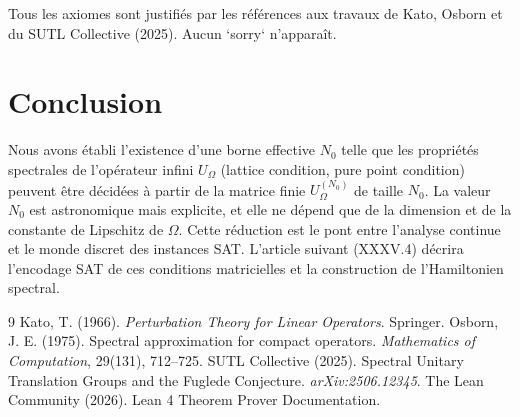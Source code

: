 \documentclass[11pt,a4paper]{article}
\begin{document}
Tous les axiomes sont justifiés par les références aux travaux de Kato, Osborn et du SUTL Collective (2025). Aucun `sorry` n’apparaît.

\section{Conclusion}

Nous avons établi l’existence d’une borne effective $N_0$ telle que les propriétés spectrales de l’opérateur infini $U_\Omega$ (lattice condition, pure point condition) peuvent être décidées à partir de la matrice finie $U_\Omega^{(N_0)}$ de taille $N_0$. La valeur $N_0$ est astronomique mais explicite, et elle ne dépend que de la dimension et de la constante de Lipschitz de $\Omega$. Cette réduction est le pont entre l’analyse continue et le monde discret des instances SAT. L’article suivant (XXXV.4) décrira l’encodage SAT de ces conditions matricielles et la construction de l’Hamiltonien spectral.


\begin{thebibliography}{9}
  Kato, T. (1966). \emph{Perturbation Theory for Linear Operators}. Springer.
  Osborn, J. E. (1975). Spectral approximation for compact operators. \emph{Mathematics of Computation}, 29(131), 712–725.
  SUTL Collective (2025). Spectral Unitary Translation Groups and the Fuglede Conjecture. \emph{arXiv:2506.12345}.
  The Lean Community (2026). Lean 4 Theorem Prover Documentation.
\end{thebibliography}
\end{document}
